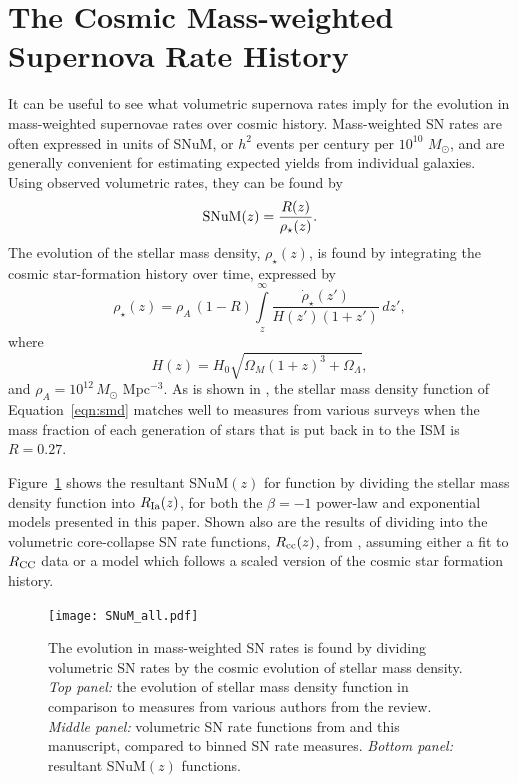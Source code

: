 \documentclass[apj, linenumbers]{aastex62}
\begin{document}
\section{The Cosmic Mass-weighted Supernova Rate History}\label{sec:snum}
It can be useful to see what volumetric supernova rates imply for the evolution in mass-weighted supernovae rates over cosmic history. Mass-weighted SN rates are often expressed in units of SNuM, or $h^2$ events per century per $10^{10}$ $M_{\odot}$, and are generally convenient for estimating expected yields from individual galaxies. Using observed volumetric rates, they can be found by
\begin{equation}
	{\rm SNuM}(z) = \frac{R(z)}{{\rho}_{\star}(z)}.
\end{equation}
\noindent The evolution of the stellar mass density, ${\rho}_{\star}(z)$, is found by integrating the cosmic star-formation history over time, expressed by
\begin{equation}
	\rho_{\star}(z)=\rho_A\,(1-R) \int\limits_z^{\infty}\frac{\dot{\rho}_{\star}(z')}{H(z')(1+z')}\,dz',
	\label{eqn:smd}
\end{equation}
\noindent where 
\begin{equation}
	H(z) = H_0\sqrt{\Omega_M(1+z)^3+\Omega_{\Lambda}},
\end{equation}
\noindent and $\rho_A=10^{12}\, M_{\odot}$ Mpc$^{-3}$. As is shown in \cite{Madau:2014fk}, the stellar mass density function of Equation~\ref{eqn:smd} matches well to measures from various surveys when the mass fraction of each generation of stars that is put back in to the ISM is $R=0.27$.  

Figure~\ref{fig:SNuM} shows the resultant SNuM$(z)$ for function by dividing the stellar mass density function into $R_{\rm Ia}(z)$, for both the $\beta=-1$ power-law and exponential models presented in this paper. Shown also are the results of dividing into the volumetric core-collapse SN rate functions, $R_{\rm cc}(z)$, from \cite{Strolger:2015aa}, assuming either a fit to $R_{\rm CC}$ data or a model which follows a scaled version of the cosmic star formation history. 

\begin{figure}[t] 
   \centering
   \texttt{[image: SNuM\_all.pdf]}
   \caption{\footnotesize The evolution in mass-weighted SN rates is found by dividing volumetric SN rates by the cosmic evolution of stellar mass density. \textit{Top panel:} the evolution of stellar mass density function in comparison to measures from various authors from the \cite{Madau:2014fk} review. \textit{Middle panel:} volumetric SN rate functions from \cite{Strolger:2015aa} and this manuscript, compared to binned SN rate measures.  \textit{Bottom panel:} resultant SNuM$(z)$ functions.}
   \label{fig:SNuM}
\end{figure}
\end{document}
